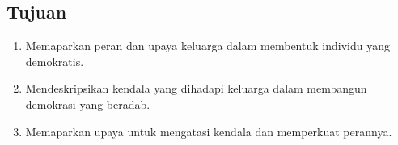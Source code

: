 \subsection{Tujuan}

\begin{enumerate}
    \item Memaparkan peran dan upaya keluarga dalam membentuk individu yang demokratis.
    \item Mendeskripsikan kendala yang dihadapi keluarga dalam membangun demokrasi yang beradab.
    \item Memaparkan upaya untuk mengatasi kendala dan memperkuat perannya.
\end{enumerate}